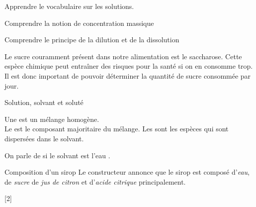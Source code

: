\teteSndSolu

\vspace*{-36pt}

\begin{objectifs}
  \item Apprendre le vocabulaire sur les solutions.
  \item Comprendre la notion de concentration massique
  \item Comprendre le principe de la dilution et de la dissolution
\end{objectifs}


\begin{contexte}
  Le sucre couramment présent dans notre alimentation est le saccharose.
  Cette espèce chimique peut entraîner des risques pour la santé si on en consomme trop.
  Il est donc important de pouvoir déterminer la quantité de sucre consommée par jour.

\end{contexte}


\begin{doc}{Solution, solvant et soluté}
  \begin{importants}
    \chevron Une  est un mélange homogène. \\
    Le  est le composant majoritaire du mélange.
    Les  sont les espèces qui sont dispersées dans le solvant.
  \end{importants}
  
  \begin{center}
  \end{center}
  
  \begin{importants}
    On parle de  si le solvant est l'eau .
  \end{importants}
\end{doc}

\begin{doc}{Composition d'un sirop}
  Le constructeur annonce que le sirop est composé d'\textit{eau}, de \textit{sucre} de \textit{jus de citron} et d'\textit{acide citrique} principalement.
\end{doc}


[2]


